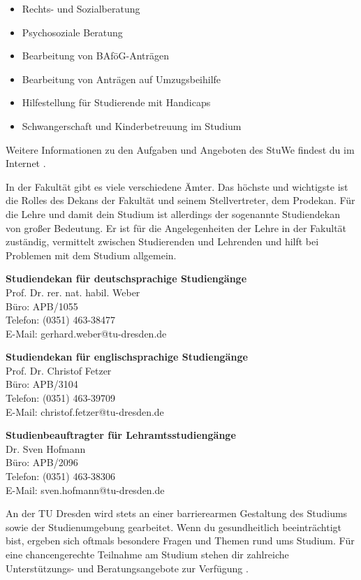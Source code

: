 \begin{itemize}
\item Rechts- und Sozialberatung
\item Psychosoziale Beratung
\item Bearbeitung von BAföG-Anträgen
\item Bearbeitung von Anträgen auf Umzugsbeihilfe
\item Hilfestellung für Studierende mit Handicaps
\item Schwangerschaft und Kinderbetreuung im Studium
\end{itemize}

Weitere Informationen zu den Aufgaben und Angeboten des StuWe findest du im Internet .

In der Fakultät gibt es viele verschiedene Ämter. 
Das höchste und wichtigste ist die Rolles des Dekans der Fakultät und seinem Stellvertreter, dem Prodekan. 
Für die Lehre und damit dein Studium ist allerdings der sogenannte Studiendekan von großer Bedeutung.
Er ist für die Angelegenheiten der Lehre in der Fakultät zuständig, vermittelt zwischen Studierenden und Lehrenden und hilft bei Problemen mit dem Studium allgemein.

\textbf{Studiendekan für deutschsprachige Studiengänge}\\
Prof. Dr. rer. nat. habil. Weber \\
Büro: APB/1055 \\
Telefon: (0351) 463-38477 \\
E-Mail: gerhard.weber@tu-dresden.de

\textbf{Studiendekan für englischsprachige Studiengänge}\\
Prof. Dr. Christof Fetzer \\
Büro: APB/3104 \\
Telefon: (0351) 463-39709 \\
E-Mail: christof.fetzer@​tu-dresden.de

\textbf{Studienbeauftragter für Lehramtsstudiengänge}\\
Dr. Sven Hofmann \\
Büro: APB/2096 \\
Telefon: (0351) 463-38306 \\
E-Mail: sven.hofmann@​tu-dresden.de


An der TU Dresden wird stets an einer barrierearmen Gestaltung des Studiums sowie der Studienumgebung gearbeitet.
Wenn du gesundheitlich beeinträchtigt bist, ergeben sich oftmals besondere Fragen und Themen rund ums Studium. 
Für eine chancengerechte Teilnahme am Studium stehen dir zahlreiche Unterstützungs- und Beratungsangebote zur Verfügung .


